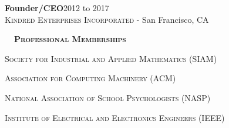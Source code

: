 \documentclass[hidelinks, 10pt]{article}
\def\contentblockspacing{2.5mm}     %
\def\sectionspacing{5mm}            %
\def\sectiontocontentspacing{4mm}   %
\renewcommand{\section}[1]{
    {\fontsize{14}{14}\selectfont \textsc{\textbf{\ \ #1\ \ }}}\hrulefill
}
\begin{document}
\vspace{\contentblockspacing}

\begin{minipage}[ct]{0.9\linewidth}
    \textbf{Founder/CEO}\hfill 2012 to 2017\\
    {\textsc{Kindred Enterprises Incorporated} - San Francisco, CA}
\end{minipage}



\vspace{\sectionspacing}


\section{Professional Memberships}
\vspace{\sectiontocontentspacing}

\begin{minipage}[ct]{0.9\linewidth}
    \textsc{Society for Industrial and Applied Mathematics} (SIAM)
\end{minipage}

\vspace{0.5mm}

\begin{minipage}[ct]{0.9\linewidth}
    \textsc{Association for Computing Machinery} (ACM)
\end{minipage}

\vspace{0.5mm}

\begin{minipage}[ct]{0.9\linewidth}
    \textsc{National Association of School Psychologists} (NASP)
\end{minipage}

\vspace{0.5mm}

\begin{minipage}[ct]{0.9\linewidth}
    \textsc{Institute of Electrical and Electronics Engineers} (IEEE)
\end{minipage}
\end{document}
